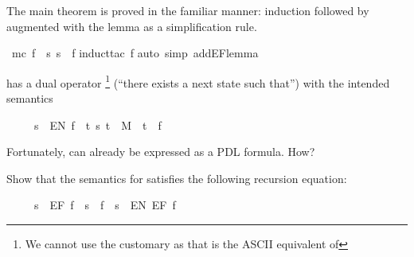 \begin{isabellebody}
%
\begin{isamarkuptext}%
The main theorem is proved in the familiar manner: induction followed by
 augmented with the lemma as a simplification rule.%
\end{isamarkuptext}%
\ {\isachardoublequote}mc\ f\ {\isacharequal}\ {\isacharbraceleft}s{\isachardot}\ s\ {\isasymTurnstile}\ f{\isacharbraceright}{\isachardoublequote}\isanewline
{}induct{\isacharunderscore}tac\ f{\isacharparenright}\isanewline
{}auto\ simp\ add{\isacharcolon}EF{\isacharunderscore}lemma{\isacharparenright}\isanewline
{}%
\begin{isamarkuptext}%
\begin{exercise}
 has a dual operator \footnote{We cannot use the customary 
as that is the ASCII equivalent of \isa{{\isasymexists}}}
(``there exists a next state such that'') with the intended semantics
\begin{isabelle}%
\ \ \ \ \ s\ {\isasymTurnstile}\ EN\ f\ {\isacharequal}\ {\isacharparenleft}{\isasymexists}t{\isachardot}\ {\isacharparenleft}s{\isacharcomma}\ t{\isacharparenright}\ {\isasymin}\ M\ {\isasymand}\ t\ {\isasymTurnstile}\ f{\isacharparenright}%
\end{isabelle}
Fortunately,  can already be expressed as a PDL formula. How?

Show that the semantics for  satisfies the following recursion equation:
\begin{isabelle}%
\ \ \ \ \ s\ {\isasymTurnstile}\ EF\ f\ {\isacharequal}\ {\isacharparenleft}s\ {\isasymTurnstile}\ f\ {\isasymor}\ s\ {\isasymTurnstile}\ EN\ {\isacharparenleft}EF\ f{\isacharparenright}{\isacharparenright}%
\end{isabelle}
\end{exercise}
%
\end{isamarkuptext}%
\end{isabellebody}%
